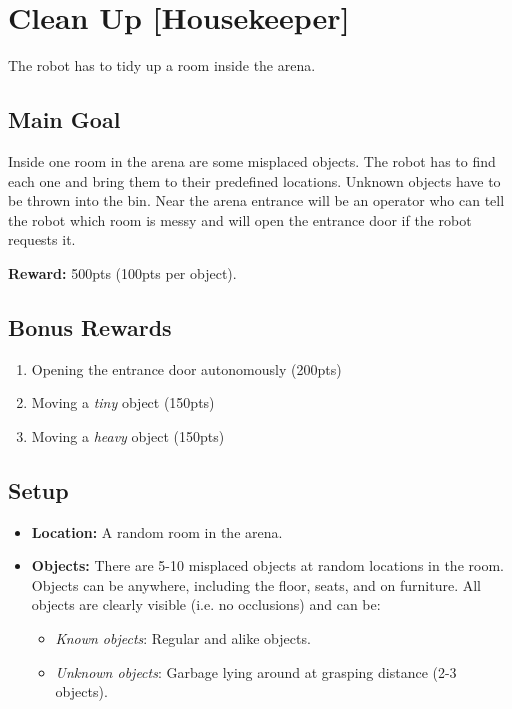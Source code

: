 \section{Clean Up [Housekeeper]}
The robot has to tidy up a room inside the arena.


\subsection{Main Goal}
Inside one room in the arena are some misplaced objects. The robot has to find each one and bring them to their predefined locations. Unknown objects have to be thrown into the bin. Near the arena entrance will be an operator who can tell the robot which room is messy and will open the entrance door if the robot requests it.

\noindent\textbf{Reward:} 500pts (100pts per object).

\subsection{Bonus Rewards}
\begin{enumerate}[nosep]
	\item Opening the entrance door autonomously (200pts)
	\item Moving a \emph{tiny} object (150pts)
	\item Moving a \emph{heavy} object (150pts)
\end{enumerate}


\subsection{Setup}
\begin{itemize}[nosep]
	\item \textbf{Location:} A random room in the arena.

	\item \textbf{Objects:} There are 5-10 misplaced objects at random locations in the room.
	Objects can be anywhere, including the floor, seats, and on furniture.
	All objects are clearly visible (i.e. no occlusions) and can be:
	\begin{itemize}[nosep]
		\item\textit{Known objects}: Regular and alike objects.
		\item\textit{Unknown objects}: Garbage lying around at grasping distance (2-3 objects).
	\end{itemize}
\end{itemize}

